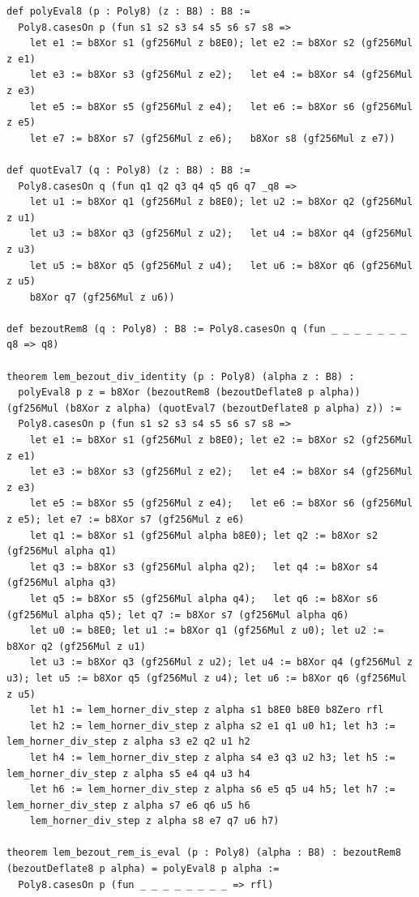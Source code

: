 \documentclass[11pt,letterpaper]{article}
\theoremstyle{spectralthm}
\begin{document}
\begin{lstlisting}[language=Lean4,caption={Standalone Pure Init.Prelude Term-Mode Lean 4 Kernel Suite (thm30--thm61, v0.0.0, 0 sorry, 0 axioms).},label={lst:lean_unified}]
def polyEval8 (p : Poly8) (z : B8) : B8 :=
  Poly8.casesOn p (fun s1 s2 s3 s4 s5 s6 s7 s8 =>
    let e1 := b8Xor s1 (gf256Mul z b8E0); let e2 := b8Xor s2 (gf256Mul z e1)
    let e3 := b8Xor s3 (gf256Mul z e2);   let e4 := b8Xor s4 (gf256Mul z e3)
    let e5 := b8Xor s5 (gf256Mul z e4);   let e6 := b8Xor s6 (gf256Mul z e5)
    let e7 := b8Xor s7 (gf256Mul z e6);   b8Xor s8 (gf256Mul z e7))

def quotEval7 (q : Poly8) (z : B8) : B8 :=
  Poly8.casesOn q (fun q1 q2 q3 q4 q5 q6 q7 _q8 =>
    let u1 := b8Xor q1 (gf256Mul z b8E0); let u2 := b8Xor q2 (gf256Mul z u1)
    let u3 := b8Xor q3 (gf256Mul z u2);   let u4 := b8Xor q4 (gf256Mul z u3)
    let u5 := b8Xor q5 (gf256Mul z u4);   let u6 := b8Xor q6 (gf256Mul z u5)
    b8Xor q7 (gf256Mul z u6))

def bezoutRem8 (q : Poly8) : B8 := Poly8.casesOn q (fun _ _ _ _ _ _ _ q8 => q8)

theorem lem_bezout_div_identity (p : Poly8) (alpha z : B8) :
  polyEval8 p z = b8Xor (bezoutRem8 (bezoutDeflate8 p alpha)) (gf256Mul (b8Xor z alpha) (quotEval7 (bezoutDeflate8 p alpha) z)) :=
  Poly8.casesOn p (fun s1 s2 s3 s4 s5 s6 s7 s8 =>
    let e1 := b8Xor s1 (gf256Mul z b8E0); let e2 := b8Xor s2 (gf256Mul z e1)
    let e3 := b8Xor s3 (gf256Mul z e2);   let e4 := b8Xor s4 (gf256Mul z e3)
    let e5 := b8Xor s5 (gf256Mul z e4);   let e6 := b8Xor s6 (gf256Mul z e5); let e7 := b8Xor s7 (gf256Mul z e6)
    let q1 := b8Xor s1 (gf256Mul alpha b8E0); let q2 := b8Xor s2 (gf256Mul alpha q1)
    let q3 := b8Xor s3 (gf256Mul alpha q2);   let q4 := b8Xor s4 (gf256Mul alpha q3)
    let q5 := b8Xor s5 (gf256Mul alpha q4);   let q6 := b8Xor s6 (gf256Mul alpha q5); let q7 := b8Xor s7 (gf256Mul alpha q6)
    let u0 := b8E0; let u1 := b8Xor q1 (gf256Mul z u0); let u2 := b8Xor q2 (gf256Mul z u1)
    let u3 := b8Xor q3 (gf256Mul z u2); let u4 := b8Xor q4 (gf256Mul z u3); let u5 := b8Xor q5 (gf256Mul z u4); let u6 := b8Xor q6 (gf256Mul z u5)
    let h1 := lem_horner_div_step z alpha s1 b8E0 b8E0 b8Zero rfl
    let h2 := lem_horner_div_step z alpha s2 e1 q1 u0 h1; let h3 := lem_horner_div_step z alpha s3 e2 q2 u1 h2
    let h4 := lem_horner_div_step z alpha s4 e3 q3 u2 h3; let h5 := lem_horner_div_step z alpha s5 e4 q4 u3 h4
    let h6 := lem_horner_div_step z alpha s6 e5 q5 u4 h5; let h7 := lem_horner_div_step z alpha s7 e6 q6 u5 h6
    lem_horner_div_step z alpha s8 e7 q7 u6 h7)

theorem lem_bezout_rem_is_eval (p : Poly8) (alpha : B8) : bezoutRem8 (bezoutDeflate8 p alpha) = polyEval8 p alpha :=
  Poly8.casesOn p (fun _ _ _ _ _ _ _ _ => rfl)


\end{lstlisting}
\end{document}

